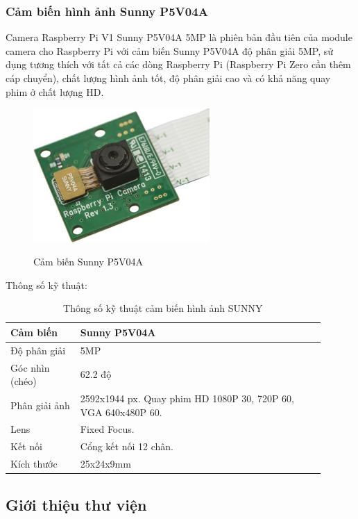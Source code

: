 \documentclass{article}
\begin{document}
\subsubsection{Cảm biến hình ảnh Sunny P5V04A}

Camera Raspberry Pi V1 Sunny P5V04A 5MP là phiên bản đầu tiên của module camera cho Raspberry Pi với cảm biến Sunny P5V04A độ phân giải 5MP, sử dụng tương thích với tất cả các dòng Raspberry Pi (Raspberry Pi Zero cần thêm cáp chuyển), chất lượng hình ảnh tốt, độ phân giải cao và có khả năng quay phim ở chất lượng HD.

\begin{figure}[ht]
\centering
\includegraphics[width=0.6\textwidth]{Sunny.jpg}
\label{Sunny P5V04A}
\caption{Cảm biến Sunny P5V04A}
\end{figure}

Thông số kỹ thuật:
\begin{table}[ht]
    \centering
    \begin{tabular}{p{0.2\linewidth}|p{0.7\linewidth}}
    \hline
Cảm biến & Sunny P5V04A \\
\hline
Độ phân giải & 5MP \\ \hline
Góc nhìn (chéo) & 62.2 độ \\ \hline
Phân giải ảnh & 2592x1944 px. \hfill
\break
Quay phim HD 1080P 30, 720P 60, VGA 640x480P 60.\\ \hline
Lens & Fixed Focus. \\ \hline
Kết nối & Cổng kết nối 12 chân.\\
\hline
Kích thước & 25x24x9mm \\
\hline
    \end{tabular}
    \caption{Thông số kỹ thuật cảm biến hình ảnh SUNNY}
    \label{sunny}
\end{table}
\subsection{Giới thiệu thư viện}
\end{document}

